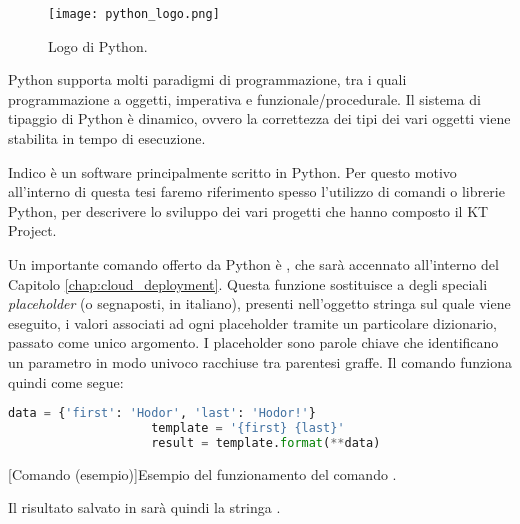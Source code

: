         	\begin{figure}[h!]
        		\begin{center}
        			\texttt{[image: python\_logo.png]}
        		\end{center}
        		\caption[Logo di Python]{Logo di Python.}
        		\label{fig:python_logo}
        	\end{figure}
        	
        	Python supporta molti paradigmi di programmazione, tra i quali programmazione a oggetti, imperativa e funzionale/procedurale. Il sistema di tipaggio di Python è dinamico, ovvero la correttezza dei tipi dei vari oggetti viene stabilita in tempo di esecuzione.
        	
        	Indico è un software principalmente scritto in Python. Per questo motivo all'interno di questa tesi faremo riferimento spesso l'utilizzo di comandi o librerie Python, per descrivere lo sviluppo dei vari progetti che hanno composto il KT Project.
        
            Un importante comando offerto da Python è , che sarà accennato all'interno del Capitolo \ref{chap:cloud_deployment}. Questa funzione sostituisce a degli speciali \textit{placeholder} (o segnaposti, in italiano), presenti nell'oggetto stringa sul quale viene eseguito, i valori associati ad ogni placeholder tramite un particolare dizionario, passato come unico argomento. I placeholder sono parole chiave che identificano un parametro in modo univoco racchiuse tra parentesi graffe. Il comando  funziona quindi come segue:
            
            \begin{center}
                \begin{lstlisting}[language=python, gobble=18]
                    data = {'first': 'Hodor', 'last': 'Hodor!'}
                    template = '{first} {last}'
                    result = template.format(**data)
                \end{lstlisting}
                \captionsetup{textformat=empty,labelformat=empty} \vspace{-2em}
                [Comando  (esempio)]{Esempio del funzionamento del comando .}
            \end{center}
            
            Il risultato salvato in  sarà quindi la stringa .
        
